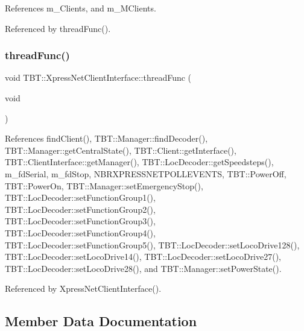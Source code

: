 References m\+\_\+\+Clients, and m\+\_\+\+M\+Clients.



Referenced by thread\+Func().

\mbox{\label{classTBT_1_1XpressNetClientInterface_a8b49b38dfe0d208f643f7c65d380f31b_a8b49b38dfe0d208f643f7c65d380f31b}} 
\subsubsection{\texorpdfstring{thread\+Func()}{threadFunc()}}
{\footnotesize\ttfamily void T\+B\+T\+::\+Xpress\+Net\+Client\+Interface\+::thread\+Func (\begin{DoxyParamCaption}\item[{void}]{ }\end{DoxyParamCaption})\hspace{0.3cm}{\ttfamily [private]}}



References find\+Client(), T\+B\+T\+::\+Manager\+::find\+Decoder(), T\+B\+T\+::\+Manager\+::get\+Central\+State(), T\+B\+T\+::\+Client\+::get\+Interface(), T\+B\+T\+::\+Client\+Interface\+::get\+Manager(), T\+B\+T\+::\+Loc\+Decoder\+::get\+Speedsteps(), m\+\_\+fd\+Serial, m\+\_\+fd\+Stop, N\+B\+R\+X\+P\+R\+E\+S\+S\+N\+E\+T\+P\+O\+L\+L\+E\+V\+E\+N\+TS, T\+B\+T\+::\+Power\+Off, T\+B\+T\+::\+Power\+On, T\+B\+T\+::\+Manager\+::set\+Emergency\+Stop(), T\+B\+T\+::\+Loc\+Decoder\+::set\+Function\+Group1(), T\+B\+T\+::\+Loc\+Decoder\+::set\+Function\+Group2(), T\+B\+T\+::\+Loc\+Decoder\+::set\+Function\+Group3(), T\+B\+T\+::\+Loc\+Decoder\+::set\+Function\+Group4(), T\+B\+T\+::\+Loc\+Decoder\+::set\+Function\+Group5(), T\+B\+T\+::\+Loc\+Decoder\+::set\+Loco\+Drive128(), T\+B\+T\+::\+Loc\+Decoder\+::set\+Loco\+Drive14(), T\+B\+T\+::\+Loc\+Decoder\+::set\+Loco\+Drive27(), T\+B\+T\+::\+Loc\+Decoder\+::set\+Loco\+Drive28(), and T\+B\+T\+::\+Manager\+::set\+Power\+State().



Referenced by Xpress\+Net\+Client\+Interface().



\subsection{Member Data Documentation}
\mbox{\label{classTBT_1_1XpressNetClientInterface_ac064949432059e1c5210c56b43bb1168_ac064949432059e1c5210c56b43bb1168}} 
